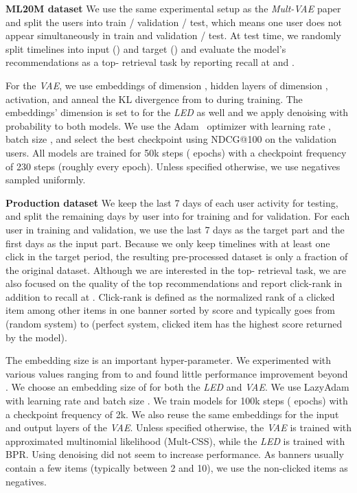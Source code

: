 \documentclass[sigconf]{acmart}
\begin{document}
\textbf{ML20M dataset} We use the same experimental setup as the \emph{Mult-VAE} paper~\cite{variational-liang-2018} and split the users into train / validation / test, which means one user does not appear simultaneously in train and validation / test. At test time, we randomly split timelines into input () and target () and evaluate the model's recommendations as a top- retrieval task by reporting recall at  and . 

For the \emph{VAE}, we use embeddings of dimension , hidden layers of dimension ,  activation, and anneal the KL divergence from  to  during training. The embeddings' dimension is set to  for the \emph{LED} as well and we apply denoising with probability  to both models. We use the Adam~\cite{adam-iclr-2015} optimizer with learning rate , batch size , and select the best checkpoint using NDCG@100 on the validation users. All models are trained for 50k steps (  epochs) with a checkpoint frequency of 230 steps (roughly every epoch). Unless specified otherwise, we use  negatives sampled uniformly.

\textbf{Production dataset} We keep the last 7 days of each user activity for testing, and split the remaining days by user into  for training and  for validation. For each user in training and validation, we use the last 7 days as the target part and the first days as the input part. Because we only keep timelines with at least one click in the target period, the resulting pre-processed dataset is only a fraction of the original dataset. Although we are interested in the top- retrieval task, we are also focused on the quality of the top recommendations and report click-rank in addition to recall at . Click-rank is defined as the normalized rank of a clicked item among other items in one banner sorted by score and typically goes from  (random system) to  (perfect system, clicked item has the highest score returned by the model).

The embedding size is an important hyper-parameter. We experimented with various values ranging from  to  and found little performance improvement beyond . We choose an embedding size of  for both the \emph{LED} and \emph{VAE}. We use LazyAdam with learning rate  and batch size . We train models for 100k steps ( epochs) with a checkpoint frequency of 2k. We also reuse the same embeddings for the input and output layers of the \emph{VAE}. Unless specified otherwise, the \emph{VAE} is trained with approximated multinomial likelihood (Mult-CSS), while the \emph{LED} is trained with BPR. Using denoising did not seem to increase performance. As banners usually contain a few items (typically between 2 and 10), we use the non-clicked items as negatives. 
\end{document}

